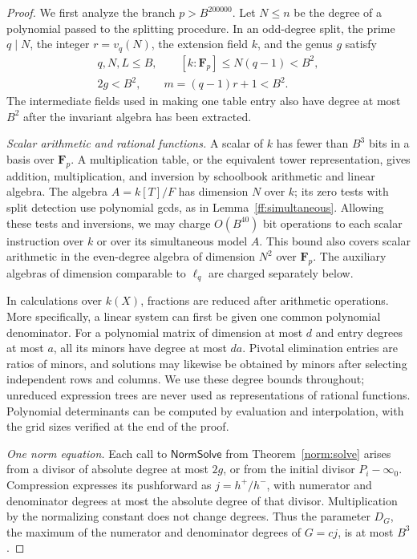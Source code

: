 \begin{proof}
We first analyze the branch $p>B^{200000}$.  Let $N\le n$ be the degree of
a polynomial passed to the splitting procedure.  In an odd-degree split,
the prime $q\mid N$, the integer $r=v_q(N)$, the extension field $k$, and
the genus $g$ satisfy
\begin{equation}
 \begin{gathered}
 q,N,L\le B,\qquad [k:\mathbf F_p]\le N(q-1)<B^2,\\
 2g<B^2,\qquad m=(q-1)r+1<B^2.
 \end{gathered}
 \label{complexity:basic}
\end{equation}
The intermediate fields used in making one table entry also have degree
at most $B^2$ after the invariant algebra has been extracted.

\smallskip
\noindent\emph{Scalar arithmetic and rational functions.}
A scalar of $k$ has fewer than $B^3$ bits in a basis over $\mathbf F_p$.
A multiplication table, or the equivalent tower representation, gives
addition, multiplication, and inversion by schoolbook arithmetic and
linear algebra.  The algebra $A=k[T]/F$ has dimension $N$ over $k$;
its zero tests with split detection use polynomial gcds, as in
Lemma~\ref{ff:simultaneous}.  Allowing these tests and inversions, we may
charge $O(B^{40})$ bit operations to each scalar instruction over $k$ or
over its simultaneous model $A$.  This bound also covers scalar arithmetic
in the even-degree algebra of dimension $N^2$ over $\mathbf F_p$.
The auxiliary algebras of dimension comparable to $\ell_q$ are charged
separately below.

In calculations over $k(X)$, fractions are reduced after arithmetic
operations.  More specifically, a linear system can first be given one
common polynomial denominator.  For a polynomial matrix of dimension
at most $d$ and entry degrees at most $a$, all its minors have degree at
most $da$.  Pivotal elimination entries are ratios of minors, and solutions
may likewise be obtained by minors after selecting independent rows and
columns.  We use these degree bounds throughout; unreduced expression trees
are never used as representations of rational functions.  Polynomial
determinants can be computed by evaluation and interpolation, with the
grid sizes verified at the end of the proof.

\smallskip
\noindent\emph{One norm equation.}
Each call to $\mathsf{NormSolve}$ from Theorem~\ref{norm:solve} arises
from a divisor of absolute degree
at most $2g$, or from the initial divisor $P_i-\infty_0$.  Compression
expresses its pushforward as $j=h^+/h^-$, with numerator and denominator
degrees at most the absolute degree of that divisor.  Multiplication by
the normalizing constant does not change degrees.  Thus the parameter
$D_G$, the maximum of the numerator and denominator degrees of $G=cj$,
is at most $B^3$.


\end{proof}
